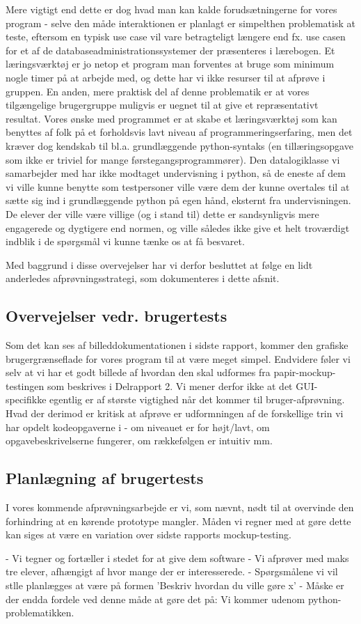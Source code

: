 \documentclass[10pt,a4paper,danish]{article}
\begin{document}
Mere vigtigt end dette er dog hvad man kan kalde forudsætningerne for vores program - selve den
måde interaktionen er planlagt er simpelthen problematisk at teste, eftersom en typisk use case
vil vare betragteligt længere end fx. use casen for et af de databaseadministrationssystemer der
præsenteres i lærebogen. Et læringsværktøj er jo netop et program man forventes at bruge som
minimum nogle timer på at arbejde med, og dette har vi ikke resurser til at afprøve i gruppen. 
En anden, mere praktisk del af denne problematik er at vores tilgængelige brugergruppe muligvis er 
uegnet til at give et repræsentativt resultat. Vores ønske med programmet er at skabe et læringsværktøj
som kan benyttes af folk på et forholdsvis lavt niveau af programmeringserfaring, men det kræver
dog kendskab til bl.a. grundlæggende python-syntaks (en tillæringsopgave som ikke er triviel for
mange førstegangsprogrammører). Den datalogiklasse vi samarbejder med har ikke modtaget undervisning
i python, så de eneste af dem vi ville kunne benytte som testpersoner ville være dem der kunne 
overtales til at sætte sig ind i grundlæggende python på egen hånd, eksternt fra undervisningen. 
De elever der ville være villige (og i stand til) dette er sandsynligvis mere engagerede og dygtigere
end normen, og ville således ikke give et helt troværdigt indblik i de spørgsmål vi kunne tænke os
at få besvaret. 

Med baggrund i disse overvejelser har vi derfor besluttet at følge en lidt anderledes afprøvningsstrategi,
som dokumenteres i dette afsnit. 

\subsection{Overvejelser vedr. brugertests}
Som det kan ses af billeddokumentationen i sidste rapport, kommer den grafiske brugergrænseflade
for vores program til at være meget simpel. Endvidere føler vi selv at vi har et godt
billede af hvordan den skal udformes fra papir-mockup-testingen som beskrives i Delrapport 2.
Vi mener derfor ikke at det GUI-specifikke egentlig er af største vigtighed når det kommer til bruger-afprøvning. 
Hvad der derimod er kritisk at afprøve er udformningen af de forskellige trin vi har opdelt 
kodeopgaverne i - om niveauet er for højt/lavt, om opgavebeskrivelserne fungerer, om rækkefølgen
er intuitiv mm. 

\subsection{Planlægning af brugertests}
I vores kommende afprøvningsarbejde er vi, som nævnt, nødt til at overvinde den forhindring at en
kørende prototype mangler. Måden vi regner med
at gøre dette kan siges at være en variation over sidste rapports mockup-testing.

- Vi tegner og fortæller i stedet for at give dem software 
- Vi afprøver med maks tre elever, afhængigt af hvor mange der er interesserede. 
- Spørgsmålene vi vil stlle planlægges at være på formen 'Beskriv hvordan du ville gøre x'
- Måske er der endda fordele ved denne måde at gøre det på: Vi kommer udenom python-problematikken. 		
\end{document}
